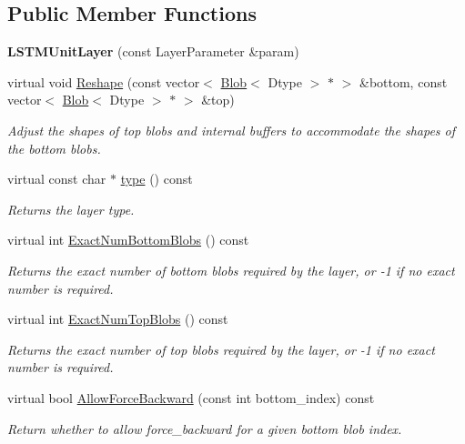 \subsection*{Public Member Functions}
\begin{DoxyCompactItemize}
\item 
{\bfseries L\+S\+T\+M\+Unit\+Layer} (const Layer\+Parameter \&param)\hypertarget{classcaffe_1_1LSTMUnitLayer_aa8eb86f949a93c724c6ed89a601aa4e0}{}\label{classcaffe_1_1LSTMUnitLayer_aa8eb86f949a93c724c6ed89a601aa4e0}

\item 
virtual void \hyperlink{classcaffe_1_1LSTMUnitLayer_ac968816014ba1a2851df2dd8792da21a}{Reshape} (const vector$<$ \hyperlink{classcaffe_1_1Blob}{Blob}$<$ Dtype $>$ $\ast$ $>$ \&bottom, const vector$<$ \hyperlink{classcaffe_1_1Blob}{Blob}$<$ Dtype $>$ $\ast$ $>$ \&top)
\begin{DoxyCompactList}\small\item\em Adjust the shapes of top blobs and internal buffers to accommodate the shapes of the bottom blobs. \end{DoxyCompactList}\item 
virtual const char $\ast$ \hyperlink{classcaffe_1_1LSTMUnitLayer_a6408d25bcd3046db18c1a7b199955886}{type} () const \hypertarget{classcaffe_1_1LSTMUnitLayer_a6408d25bcd3046db18c1a7b199955886}{}\label{classcaffe_1_1LSTMUnitLayer_a6408d25bcd3046db18c1a7b199955886}

\begin{DoxyCompactList}\small\item\em Returns the layer type. \end{DoxyCompactList}\item 
virtual int \hyperlink{classcaffe_1_1LSTMUnitLayer_a865a9e9d8b1d24cd46cabcec81169b01}{Exact\+Num\+Bottom\+Blobs} () const 
\begin{DoxyCompactList}\small\item\em Returns the exact number of bottom blobs required by the layer, or -\/1 if no exact number is required. \end{DoxyCompactList}\item 
virtual int \hyperlink{classcaffe_1_1LSTMUnitLayer_a6e547d63245347dac2aa412281d93970}{Exact\+Num\+Top\+Blobs} () const 
\begin{DoxyCompactList}\small\item\em Returns the exact number of top blobs required by the layer, or -\/1 if no exact number is required. \end{DoxyCompactList}\item 
virtual bool \hyperlink{classcaffe_1_1LSTMUnitLayer_a28bbfffaf2a438f151566c7e53bbc1d7}{Allow\+Force\+Backward} (const int bottom\+\_\+index) const 
\begin{DoxyCompactList}\small\item\em Return whether to allow force\+\_\+backward for a given bottom blob index. \end{DoxyCompactList}\end{DoxyCompactItemize}

